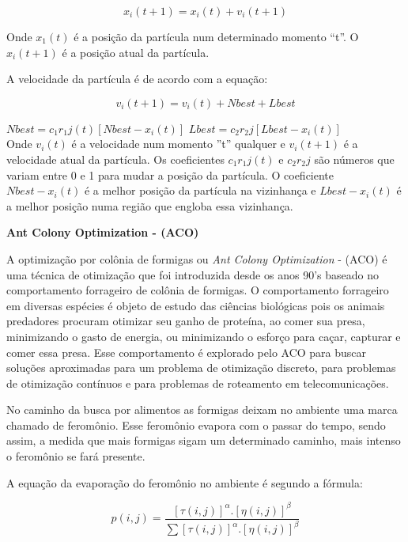 \documentclass[conference,compsoc]{IEEEtran}
\begin{document}
\begin{equation}
x_i(t+1) = x_i(t) + v_i(t+1)
\end{equation}

Onde $x_1(t)$ é a posição da partícula num determinado momento ``t''. O $x_i(t+1) $ é a posição atual da partícula.

A velocidade da partícula é de acordo com a equação:

\begin{equation}
v_i(t+1) = v_i(t) + Nbest + Lbest
\end{equation}

\flushleft $Nbest = c_1r_1j(t)[Nbest - x_i(t)]$
\flushleft $Lbest = c_2r_2j[Lbest - x_i(t)]$\\

Onde $v_i(t)$ é a velocidade num momento ''t'' qualquer e $v_i(t+1)$ é a velocidade atual da partícula.
Os coeficientes $c_1r_1j(t)$ e $c_2r_2j$ são números que variam entre 0 e 1 para mudar a posição da partícula.
O coeficiente $Nbest - x_i(t)$ é a melhor posição da partícula na vizinhança e $Lbest - x_i(t)$ é a melhor posição
numa região que engloba essa vizinhança.

\quad
\flushleft \textbf{Ant Colony Optimization - (ACO)}
\vspace{0.1cm}

A optimização por colônia de formigas ou \textit{Ant Colony Optimization} - (ACO) é uma técnica de otimização que foi
introduzida desde os anos 90's \cite{Blum2005} baseado no comportamento forrageiro de colônia de formigas.
O comportamento forrageiro em diversas espécies \cite{Dorigo2005} é objeto de estudo das ciências biológicas pois os animais predadores 
procuram otimizar seu ganho de proteína, ao comer sua presa, minimizando o gasto de energia, ou minimizando o esforço para
caçar, capturar e comer essa presa. Esse comportamento é explorado pelo ACO para buscar soluções aproximadas para um
problema de otimização discreto, para problemas de otimização contínuos e para problemas de roteamento em telecomunicações.

No caminho da busca por alimentos as formigas deixam no ambiente uma marca chamado de feromônio.
Esse feromônio evapora com o passar do tempo, sendo assim, a medida que mais formigas sigam um determinado caminho,
mais intenso o feromônio se fará presente. 

A equação da evaporação do feromônio no ambiente é segundo a fórmula:

\begin{equation}
p(i,j)= \frac{[\tau (i,j)]^{\alpha }.[\eta (i,j)]^{\beta}}{\sum [\tau (i,j)]^{\alpha }.[\eta (i,j)]^{\beta}}
\end{equation}
\end{document}
